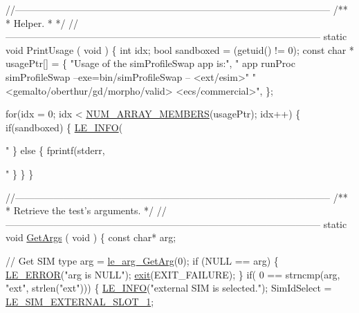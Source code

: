 \begin{DoxyCodeInclude}
{{{{{{{{{{{{{\textcolor{comment}{//--------------------------------------------------------------------------------------------------}\textcolor{comment}{}
\textcolor{comment}{/**}
\textcolor{comment}{ * Helper.}
\textcolor{comment}{ *}
\textcolor{comment}{ */}
\textcolor{comment}{//--------------------------------------------------------------------------------------------------}
\textcolor{keyword}{static} \textcolor{keywordtype}{void} PrintUsage
(
    \textcolor{keywordtype}{void}
)
\{
    \textcolor{keywordtype}{int} idx;
    \textcolor{keywordtype}{bool} sandboxed = (getuid() != 0);
    \textcolor{keyword}{const} \textcolor{keywordtype}{char} * usagePtr[] =
    \{
            \textcolor{stringliteral}{"Usage of the simProfileSwap app is:"},
            \textcolor{stringliteral}{"   app runProc simProfileSwap --exe=bin/simProfileSwap -- <ext/esim>"}
              \textcolor{stringliteral}{" <gemalto/oberthur/gd/morpho/valid> <ecs/commercial>"},
    \};

    \textcolor{keywordflow}{for}(idx = 0; idx < \hyperlink{le__basics_8h_a8d8f28a045f43b477cafb67a99894c07}{NUM\_ARRAY\_MEMBERS}(usagePtr); idx++)
    \{
        \textcolor{keywordflow}{if}(sandboxed)
        \{
            \hyperlink{le__log_8h_a23e6d206faa64f612045d688cdde5808}{LE\_INFO}(\textcolor{stringliteral}{"%
        \}
        \textcolor{keywordflow}{else}
        \{
            fprintf(stderr, \textcolor{stringliteral}{"%
        \}
    \}
\}

\textcolor{comment}{//--------------------------------------------------------------------------------------------------}\textcolor{comment}{}
\textcolor{comment}{/**}
\textcolor{comment}{ * Retrieve the test's arguments.}
\textcolor{comment}{ */}
\textcolor{comment}{//--------------------------------------------------------------------------------------------------}
\textcolor{keyword}{static} \textcolor{keywordtype}{void} \hyperlink{proc_8c_a6883b9a3058f054e75827661a8d8a12d}{GetArgs}
(
    \textcolor{keywordtype}{void}
)
\{
    \textcolor{keyword}{const} \textcolor{keywordtype}{char}*  arg;

    \textcolor{comment}{// Get SIM type}
    arg = \hyperlink{le__args_8h_a5ebca8229facd069785639cb3c1e273a}{le\_arg\_GetArg}(0);
    \textcolor{keywordflow}{if} (NULL == arg)
    \{
        \hyperlink{le__log_8h_a353590f91b3143a7ba3a416ae5a50c3d}{LE\_ERROR}(\textcolor{stringliteral}{"arg is NULL"});
        \hyperlink{app_stop_client_8c_a310220604a584e112ba8f7aa3dfe23f1}{exit}(EXIT\_FAILURE);
    \}
    \textcolor{keywordflow}{if}( 0 == strncmp(arg, \textcolor{stringliteral}{"ext"}, strlen(\textcolor{stringliteral}{"ext"})))
    \{
        \hyperlink{le__log_8h_a23e6d206faa64f612045d688cdde5808}{LE\_INFO}(\textcolor{stringliteral}{"external SIM is selected."});
        SimIdSelect = \hyperlink{le__sim__interface_8h_aace49df88426119626fb1ef4e544ccdda4270fb44e8fa7876f337864675b42f2d}{LE\_SIM\_EXTERNAL\_SLOT\_1};

}}}}}}}}}}}}}}}
\end{DoxyCodeInclude}
